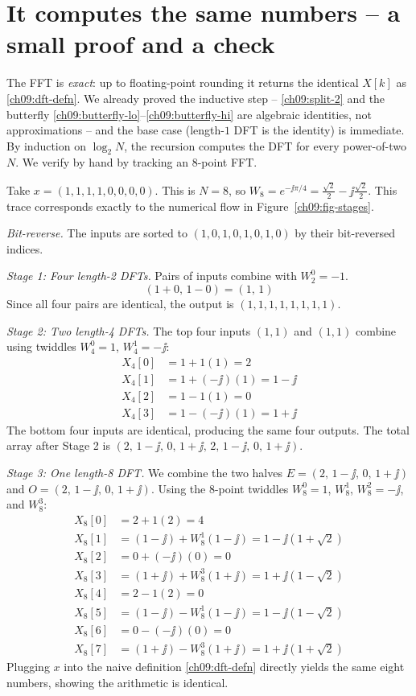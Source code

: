 \section{It computes the same numbers -- a small proof and a check}
\label{ch09:exact}

The FFT is \emph{exact}: up to floating-point rounding it returns the identical $X[k]$ as
\eqref{ch09:dft-defn}. We already proved the inductive step -- \eqref{ch09:split-2} and
the butterfly \eqref{ch09:butterfly-lo}--\eqref{ch09:butterfly-hi} are algebraic
identities, not approximations -- and the base case (length-$1$ DFT is the identity) is
immediate. By induction on $\log_2 N$, the recursion computes the DFT for every
power-of-two $N$. We verify by hand by tracking an 8-point FFT.

\begin{example}
\label{ch09:ex-n8}
Take $x = (1, 1, 1, 1, 0, 0, 0, 0)$. This is $N=8$, so $W_8 = e^{-\jj\pi/4} = \frac{\sqrt{2}}{2} - \jj\frac{\sqrt{2}}{2}$.
This trace corresponds exactly to the numerical flow in Figure~\ref{ch09:fig-stages}.

\emph{Bit-reverse.} The inputs are sorted to $(1, 0, 1, 0, 1, 0, 1, 0)$ by their bit-reversed indices.

\emph{Stage 1: Four length-2 DFTs.}
Pairs of inputs combine with $W_2^0 = -1$.
\[
(1+0,\, 1-0) = (1,\, 1)
\]
Since all four pairs are identical, the output is $(1, 1, 1, 1, 1, 1, 1, 1)$.

\emph{Stage 2: Two length-4 DFTs.}
The top four inputs $(1, 1)$ and $(1, 1)$ combine using twiddles $W_4^0=1$, $W_4^1=-\jj$:
\begin{align*}
X_4[0] &= 1 + 1(1) = 2 \\
X_4[1] &= 1 + (-\jj)(1) = 1-\jj \\
X_4[2] &= 1 - 1(1) = 0 \\
X_4[3] &= 1 - (-\jj)(1) = 1+\jj
\end{align*}
The bottom four inputs are identical, producing the same four outputs.
The total array after Stage 2 is $(2,\, 1-\jj,\, 0,\, 1+\jj,\, 2,\, 1-\jj,\, 0,\, 1+\jj)$.

\emph{Stage 3: One length-8 DFT.}
We combine the two halves $E = (2,\, 1-\jj,\, 0,\, 1+\jj)$ and $O = (2,\, 1-\jj,\, 0,\, 1+\jj)$. Using the 8-point twiddles $W_8^0 = 1$, $W_8^1$, $W_8^2 = -\jj$, and $W_8^3$:
\begin{align*}
X_8[0] &= 2 + 1(2) = 4 \\
X_8[1] &= (1-\jj) + W_8^1(1-\jj) = 1 - \jj(1+\sqrt{2}) \\
X_8[2] &= 0 + (-\jj)(0) = 0 \\
X_8[3] &= (1+\jj) + W_8^3(1+\jj) = 1 + \jj(1-\sqrt{2}) \\
X_8[4] &= 2 - 1(2) = 0 \\
X_8[5] &= (1-\jj) - W_8^1(1-\jj) = 1 - \jj(1-\sqrt{2}) \\
X_8[6] &= 0 - (-\jj)(0) = 0 \\
X_8[7] &= (1+\jj) - W_8^3(1+\jj) = 1 + \jj(1+\sqrt{2})
\end{align*}
Plugging $x$ into the naive definition \eqref{ch09:dft-defn} directly yields the same eight numbers, showing the arithmetic is identical.
\end{example}


